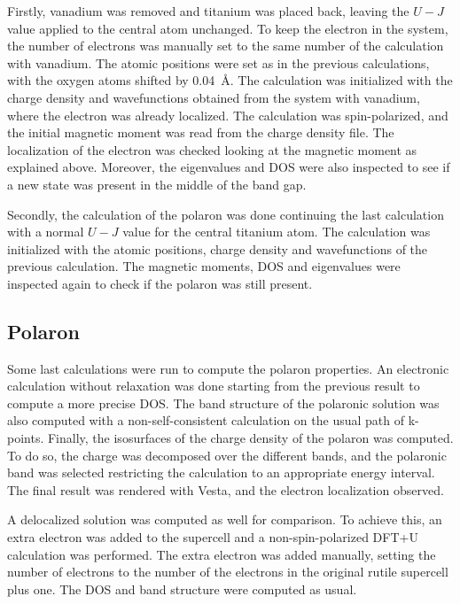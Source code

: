 Firstly, vanadium was removed and titanium was placed back, leaving
the $U-J$ value applied to the central atom unchanged. To keep the electron in the system, the number of electrons was manually set to the same number of the calculation with vanadium. The atomic positions were set as in the previous calculations, with the oxygen atoms shifted by \SI{0.04}{\angstrom}. The calculation was initialized with the charge density and wavefunctions obtained from the system with vanadium, where the electron was already localized.
The calculation was spin-polarized, and the initial magnetic moment was read from the charge density file. The localization of the electron was checked looking at the magnetic moment as explained above. Moreover, the eigenvalues and DOS were also inspected to see if a new state was present in the middle of the band gap.

Secondly, the calculation of the polaron was done continuing the last calculation with a normal $U-J$ value for the central titanium atom. The calculation was initialized with the atomic positions, charge density and wavefunctions of the previous calculation. The magnetic moments, DOS and eigenvalues were inspected again to check if the polaron was still present.

\subsection{Polaron}

Some last calculations were run to compute the polaron properties. An electronic calculation without relaxation was done starting from the previous result to compute a more precise DOS. The band structure of the polaronic solution was also computed with a non-self-consistent calculation on the usual path of k-points. Finally, the isosurfaces of the charge density of the polaron was computed. To do so, the charge was decomposed over the different bands, and the polaronic band was selected restricting the calculation to an appropriate energy interval. The final result was rendered with Vesta, and the electron localization observed.

A delocalized solution was computed as well for comparison. To achieve this, an extra electron was added to the supercell and a non-spin-polarized DFT+U calculation was performed. The extra electron was added manually, setting the number of electrons to the number of the electrons in the original rutile supercell plus one. The DOS and band structure were computed as usual.